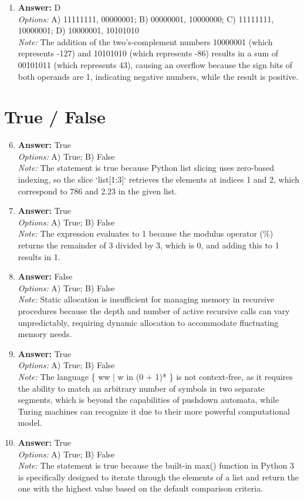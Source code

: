 \documentclass[12pt]{article}
\begin{document}
\begin{enumerate}[label=\arabic*.]
\item \textbf{Answer:} D
\\ \textit{Options:} A) 11111111, 00000001; B) 00000001, 10000000; C) 11111111, 10000001; D) 10000001, 10101010
\\ \textit{Note:} The addition of the two's-complement numbers 10000001 (which represents -127) and 10101010 (which represents -86) results in a sum of 00101011 (which represents 43), causing an overflow because the sign bits of both operands are 1, indicating negative numbers, while the result is positive.
\end{enumerate}

\section*{True / False}
\begin{enumerate}[label=\arabic*.]
\setcounter{enumi}{5}
\item \textbf{Answer:} True
\\ \textit{Options:} A) True; B) False
\\ \textit{Note:} The statement is true because Python list slicing uses zero-based indexing, so the slice `list[1:3]` retrieves the elements at indices 1 and 2, which correspond to 786 and 2.23 in the given list.
\item \textbf{Answer:} True
\\ \textit{Options:} A) True; B) False
\\ \textit{Note:} The expression evaluates to 1 because the modulus operator (\%) returns the remainder of 3 divided by 3, which is 0, and adding this to 1 results in 1.
\item \textbf{Answer:} False
\\ \textit{Options:} A) True; B) False
\\ \textit{Note:} Static allocation is insufficient for managing memory in recursive procedures because the depth and number of active recursive calls can vary unpredictably, requiring dynamic allocation to accommodate fluctuating memory needs.
\item \textbf{Answer:} True
\\ \textit{Options:} A) True; B) False
\\ \textit{Note:} The language \{ ww | w in (0 + 1)* \} is not context-free, as it requires the ability to match an arbitrary number of symbols in two separate segments, which is beyond the capabilities of pushdown automata, while Turing machines can recognize it due to their more powerful computational model.
\item \textbf{Answer:} True
\\ \textit{Options:} A) True; B) False
\\ \textit{Note:} The statement is true because the built-in max() function in Python 3 is specifically designed to iterate through the elements of a list and return the one with the highest value based on the default comparison criteria.
\end{enumerate}
\end{document}
